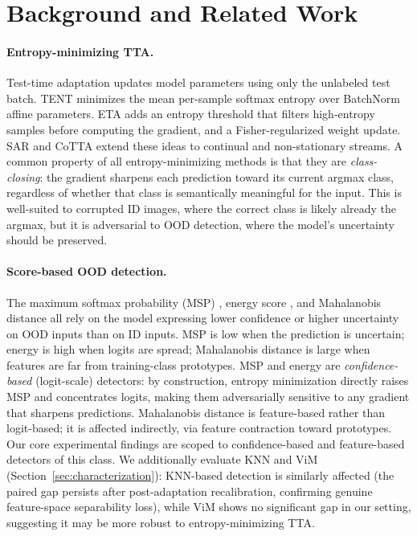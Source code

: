 \section{Background and Related Work}
\label{sec:background}

\paragraph{Entropy-minimizing TTA.}
Test-time adaptation updates model parameters using only the unlabeled test batch.
TENT \citep{tent} minimizes the mean per-sample softmax entropy over BatchNorm affine parameters.
ETA \citep{eta} adds an entropy threshold that filters high-entropy samples before computing the gradient, and a Fisher-regularized weight update.
SAR \citep{sar} and CoTTA \citep{cotta} extend these ideas to continual and non-stationary streams.
A common property of all entropy-minimizing methods is that they are \emph{class-closing}: the gradient sharpens each prediction toward its current argmax class, regardless of whether that class is semantically meaningful for the input.
This is well-suited to corrupted ID images, where the correct class is likely already the argmax, but it is adversarial to OOD detection, where the model's uncertainty should be preserved.

\paragraph{Score-based OOD detection.}
The maximum softmax probability (MSP) \citep{msp}, energy score \citep{energy}, and Mahalanobis distance \citep{mahal} all rely on the model expressing lower confidence or higher uncertainty on OOD inputs than on ID inputs.
MSP is low when the prediction is uncertain; energy is high when logits are spread; Mahalanobis distance is large when features are far from training-class prototypes.
MSP and energy are \emph{confidence-based} (logit-scale) detectors: by construction, entropy minimization directly raises MSP and concentrates logits, making them adversarially sensitive to any gradient that sharpens predictions.
Mahalanobis distance is feature-based rather than logit-based; it is affected indirectly, via feature contraction toward prototypes.
Our core experimental findings are scoped to confidence-based and feature-based detectors of this class.
We additionally evaluate KNN \citep{knn_ood} and ViM \citep{vim} (Section~\ref{sec:characterization}): KNN-based detection is similarly affected (the paired gap persists after post-adaptation recalibration, confirming genuine feature-space separability loss), while ViM shows no significant gap in our setting, suggesting it may be more robust to entropy-minimizing TTA.

